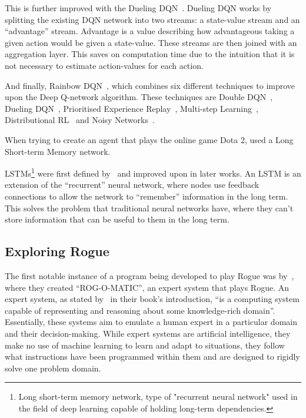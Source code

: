 \documentclass[12pt,a4paper]{article}
\begin{document}
    This is further improved with the Dueling DQN~\citep{wang16}.
    Dueling DQN works by splitting the existing DQN network into two streams: a state-value stream and an ``advantage'' stream.
    Advantage is a value describing how advantageous taking a given action would be given a state-value.
    These streams are then joined with an aggregation layer.
    This saves on computation time due to the intuition that it is not necessary to estimate action-values for each action.

    And finally, Rainbow DQN~\citep{hessel17}, which combines six different techniques to improve upon the Deep Q-network algorithm.
    These techniques are Double DQN~\citep{hasselt15}, Dueling DQN~\citep{wang16}, Prioritised Experience Replay~\citep{schaul16},
    Multi-step Learning~\citep[chap.~7.1]{sutton18}, Distributional RL~\citep{bellemare17} and Noisy Networks~\citep{fortunato19}.

    When trying to create an agent that plays the online game Dota 2, \citet{berner19} used a Long Short-term Memory network.

    LSTMs\footnote{Long short-term memory network, type of "recurrent neural network" used in the field of deep learning capable of holding long-term dependencies.} were first defined by~\citet{hochreiter97} and improved upon in later works.
    An LSTM is an extension of the ``recurrent'' neural network, where nodes use feedback connections to allow the network to ``remember'' information in the long term.
    This solves the problem that traditional neural networks have, where they can't store information that can be useful to them in the long term.

    \subsection{Exploring Rogue}\label{subsec:exploring-rogue}

    The first notable instance of a program being developed to play Rogue was by~\citet{mauldin83}, where they created ``ROG-O-MATIC'', an expert system that plays Rogue.
    An expert system, as stated by~\citet{jackson86} in their book's introduction, ``is a computing system capable of representing and reasoning about some knowledge-rich domain''.
    Essentially, these systems aim to emulate a human expert in a particular domain and their decision-making.
    While expert systems are artificial intelligence, they make no use of machine learning to learn and adapt to situations, they follow what instructions have been programmed within them and are designed to rigidly solve one problem domain.
\end{document}
